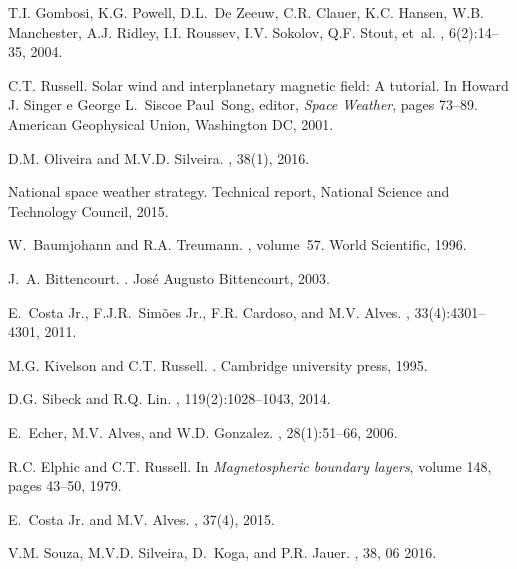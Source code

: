 \begin{thebibliography}{10}
	
	T.I. Gombosi, K.G. Powell, D.L.~De Zeeuw, C.R. Clauer, K.C. Hansen, W.B.
	Manchester, A.J. Ridley, I.I. Roussev, I.V. Sokolov, Q.F. Stout, et~al.
	, 6(2):14--35, 2004.
	
	C.T. Russell.
	\newblock Solar wind and interplanetary magnetic field: A tutorial.
	\newblock In Howard J. Singer e George L.~Siscoe Paul~Song, editor, {\em Space
		Weather}, pages 73--89. American Geophysical Union, Washington DC, 2001.
	
	D.M. Oliveira and M.V.D. Silveira.
	, 38(1), 2016.
	
	National space weather strategy.
	\newblock Technical report, National Science and Technology Council, 2015.
	
	W.~Baumjohann and R.A. Treumann.
	, volume~57.
	\newblock World Scientific, 1996.
	
	J.~A. Bittencourt.
	.
	\newblock José Augusto Bittencourt, 2003.
	
	E.~Costa Jr., F.J.R.~Sim{\~o}es Jr., F.R. Cardoso, and M.V. Alves.
	, 33(4):4301--4301,
	2011.
	
	M.G. Kivelson and C.T. Russell.
	.
	\newblock Cambridge university press, 1995.
	
	D.G. Sibeck and R.Q. Lin.
	,
	119(2):1028--1043, 2014.
	
	E.~Echer, M.V. Alves, and W.D. Gonzalez.
	, 28(1):51--66, 2006.
	
	R.C. Elphic and C.T. Russell.
	\newblock In {\em Magnetospheric boundary layers}, volume 148, pages 43--50,
	1979.
	
	E.~Costa Jr. and M.V. Alves.
	, 37(4), 2015.
	
	V.M. Souza, M.V.D. Silveira, D.~Koga, and P.R. Jauer.
	, 38, 06 2016.
	

\end{thebibliography}
